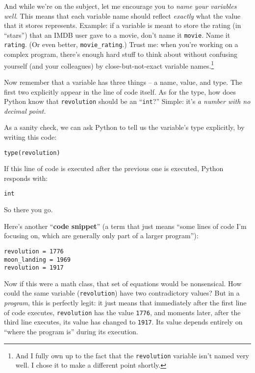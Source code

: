 And while we're on the subject, let me encourage you to \textit{name your
variables well}. This means that each variable name should reflect
\textit{exactly} what the value that it stores represents. Example: if a
variable is meant to store the rating (in ``stars'') that an IMDB user gave to
a movie, don't name it \texttt{movie}. Name it \texttt{rating}. (Or even
better, \texttt{movie\_rating}.) Trust me: when you're working on a complex
program, there's enough hard stuff to think about without confusing yourself
(and your colleagues) by close-but-not-exact variable names.\footnote{And I
fully own up to the fact that the \texttt{revolution} variable isn't named very
well. I chose it to make a different point shortly.}

Now remember that a variable has three things -- a name, value, and type. The
first two explicitly appear in the line of code itself. As for the type, how
does Python know that \texttt{revolution} should be an ``\texttt{int}?''
Simple: it's \textit{a number with no decimal point.}

As a sanity check, we can ask Python to tell us the variable's type explicitly,
by writing this code:

\begin{Verbatim}[fontsize=\small,samepage=true,frame=single,framesep=3mm]
type(revolution)
\end{Verbatim}

If this line of code is executed after the previous one is executed, Python
responds with:

\begin{Verbatim}[fontsize=\small,samepage=true,frame=leftline,framesep=5mm,framerule=1mm]
int
\end{Verbatim}

So there you go.

Here's another ``\textbf{code snippet}'' (a term that just means ``some lines
of code I'm focusing on, which are generally only part of a larger program''):

\begin{Verbatim}[fontsize=\small,samepage=true,frame=single,framesep=3mm]
revolution = 1776
moon_landing = 1969
revolution = 1917
\end{Verbatim}

Now if this were a math class, that set of equations would be nonsensical. How
could the same variable (\texttt{revolution}) have two contradictory values?
But in a \textit{program}, this is perfectly legit: it just means that
immediately after the first line of code executes, \texttt{revolution} has the
value \texttt{1776}, and moments later, after the third line executes, its
value has changed to \texttt{1917}. Its value depends entirely on ``where the
program is'' during its execution.

